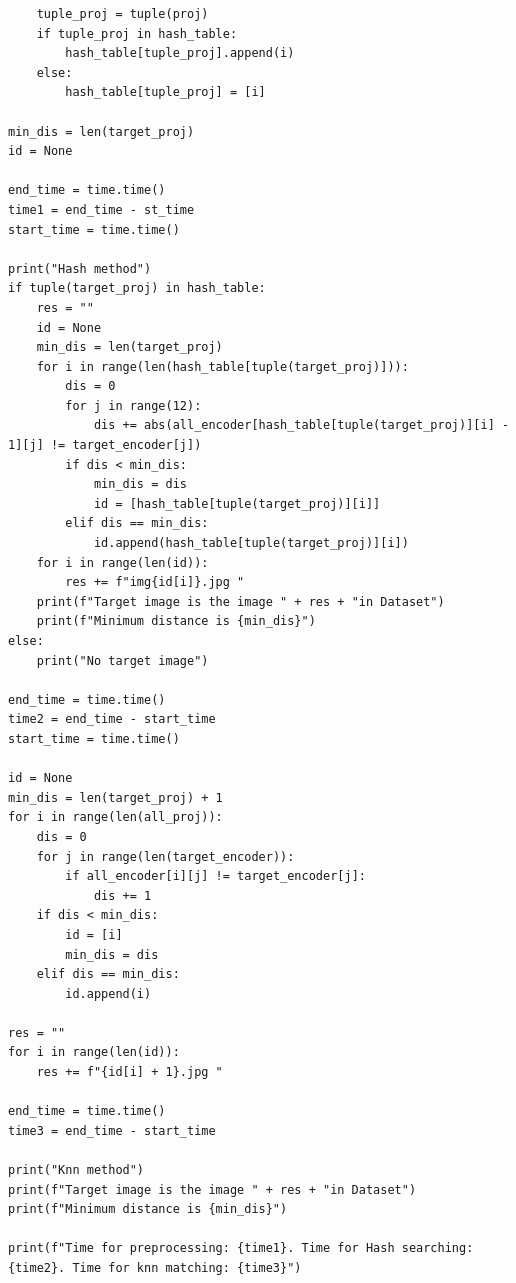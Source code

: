 \documentclass{article}
\begin{document}
\begin{lstlisting}
    tuple_proj = tuple(proj)
    if tuple_proj in hash_table:
        hash_table[tuple_proj].append(i)
    else:
        hash_table[tuple_proj] = [i]

min_dis = len(target_proj)
id = None

end_time = time.time()
time1 = end_time - st_time
start_time = time.time()

print("Hash method")
if tuple(target_proj) in hash_table:
    res = ""
    id = None
    min_dis = len(target_proj)
    for i in range(len(hash_table[tuple(target_proj)])):
        dis = 0
        for j in range(12):
            dis += abs(all_encoder[hash_table[tuple(target_proj)][i] - 1][j] != target_encoder[j])
        if dis < min_dis:
            min_dis = dis
            id = [hash_table[tuple(target_proj)][i]]
        elif dis == min_dis:
            id.append(hash_table[tuple(target_proj)][i])
    for i in range(len(id)):
        res += f"img{id[i]}.jpg "
    print(f"Target image is the image " + res + "in Dataset")
    print(f"Minimum distance is {min_dis}")
else:
    print("No target image")

end_time = time.time()
time2 = end_time - start_time
start_time = time.time()

id = None
min_dis = len(target_proj) + 1
for i in range(len(all_proj)):
    dis = 0
    for j in range(len(target_encoder)):
        if all_encoder[i][j] != target_encoder[j]:
            dis += 1
    if dis < min_dis:
        id = [i]
        min_dis = dis
    elif dis == min_dis:
        id.append(i)

res = ""
for i in range(len(id)):
    res += f"{id[i] + 1}.jpg "

end_time = time.time()
time3 = end_time - start_time

print("Knn method")
print(f"Target image is the image " + res + "in Dataset")
print(f"Minimum distance is {min_dis}")

print(f"Time for preprocessing: {time1}. Time for Hash searching: {time2}. Time for knn matching: {time3}")
\end{lstlisting}
\end{document}
